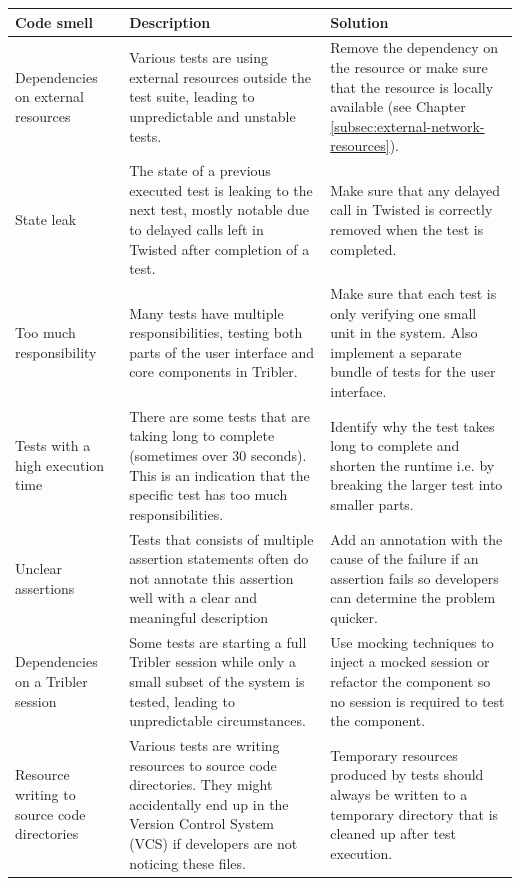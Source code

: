 \begin{table}
	\begin{tabularx}{\textwidth}{|X|X|X|}
		\hline
		\textbf{Code smell} & \textbf{Description} & \textbf{Solution}\\ \hline
		Dependencies on external resources & Various tests are using external resources outside the test suite, leading to unpredictable and unstable tests. & Remove the dependency on the resource or make sure that the resource is locally available (see Chapter \ref{subsec:external-network-resources}). \\ \hline
		State leak & The state of a previous executed test is leaking to the next test, mostly notable due to delayed calls left in Twisted after completion of a test. & Make sure that any delayed call in Twisted is correctly removed when the test is completed. \\ \hline
		Too much responsibility & Many tests have multiple responsibilities, testing both parts of the user interface and core components in Tribler. & Make sure that each test is only verifying one small unit in the system. Also implement a separate bundle of tests for the user interface.\\ \hline
		Tests with a high execution time & There are some tests that are taking long to complete (sometimes over 30 seconds). This is an indication that the specific test has too much responsibilities. & Identify why the test takes long to complete and shorten the runtime i.e. by breaking the larger test into smaller parts. \\ \hline
		Unclear assertions & Tests that consists of multiple assertion statements often do not annotate this assertion well with a clear and meaningful description & Add an annotation with the cause of the failure if an assertion fails so developers can determine the problem quicker.\\ \hline
		Dependencies on a Tribler session & Some tests are starting a full Tribler session while only a small subset of the system is tested, leading to unpredictable circumstances. & Use mocking techniques to inject a mocked session or refactor the component so no session is required to test the component. \\ \hline
		Resource writing to source code directories & Various tests are writing resources to source code directories. They might accidentally end up in the Version Control System (VCS) if developers are not noticing these files. & Temporary resources produced by tests should always be written to a temporary directory that is cleaned up after test execution. \\ \hline

\end{tabularx}
\end{table}
